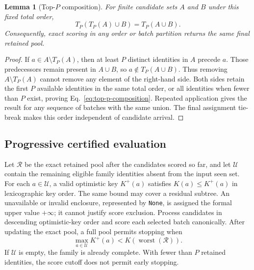 \documentclass[11pt]{article}
\newtheorem{lemma}{Lemma}
\begin{document}
\begin{lemma}[Top-$P$ composition]\label{lem:top-p}
For finite candidate sets $A$ and $B$ under this fixed total order,
\begin{equation}
 T_P\!\left(T_P(A)\cup B\right)=T_P(A\cup B).
 \label{eq:top-p-composition}
\end{equation}
Consequently, exact scoring in any order or batch partition returns the same final retained pool.
\end{lemma}
\begin{proof}
If $a\in A\setminus T_P(A)$, then at least $P$ distinct identities in $A$ precede $a$. Those predecessors remain present in $A\cup B$, so $a\notin T_P(A\cup B)$. Thus removing $A\setminus T_P(A)$ cannot remove any element of the right-hand side. Both sides retain the first $P$ available identities in the same total order, or all identities when fewer than $P$ exist, proving Eq.~\eqref{eq:top-p-composition}. Repeated application gives the result for any sequence of batches with the same union. The final assignment tie-break makes this order independent of candidate arrival.
\end{proof}

\subsection{Progressive certified evaluation}
Let $\mathcal R$ be the exact retained pool after the candidates scored so far, and let $\mathcal U$ contain the remaining eligible family identities absent from the input seen set. For each $a\in\mathcal U$, a valid optimistic key $K^+(a)$ satisfies $K(a)\le K^+(a)$ in lexicographic key order. The same bound may cover a residual subtree. An unavailable or invalid enclosure, represented by \texttt{None}, is assigned the formal upper value $+\infty$; it cannot justify score exclusion. Process candidates in descending optimistic-key order and score each selected batch canonically. After updating the exact pool, a full pool permits stopping when
\begin{equation}
 \max_{a\in\mathcal U}K^+(a)
 <K\!\left(\operatorname{worst}(\mathcal R)\right).
 \label{eq:progressive-stop}
\end{equation}
If $\mathcal U$ is empty, the family is already complete. With fewer than $P$ retained identities, the score cutoff does not permit early stopping.
\end{document}
